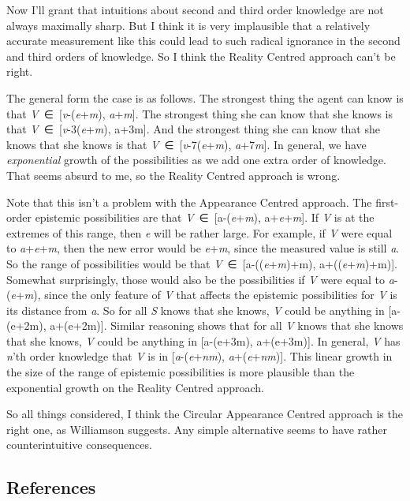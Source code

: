 \documentclass[
  10pt,
  letterpaper,
  DIV=11,
  numbers=noendperiod,
  twoside]{scrartcl}
\begin{document}
Now I'll grant that intuitions about second and third order knowledge
are not always maximally sharp. But I think it is very implausible that
a relatively accurate measurement like this could lead to such radical
ignorance in the second and third orders of knowledge. So I think the
Reality Centred approach can't be right.

The general form the case is as follows. The strongest thing the agent
can know is that \emph{V}~∈~{[}\emph{v}-(\emph{e}+\emph{m}),
\emph{a}+\emph{m}{]}. The strongest thing she can know that she knows is
that \emph{V}~∈~{[}\emph{v}-3(\emph{e}+\emph{m}), a+3m{]}. And the
strongest thing she can know that she knows that she knows is that
\emph{V}~∈~{[}\emph{v}-7(\emph{e}+\emph{m}), \emph{a}+7\emph{m}{]}. In
general, we have \emph{exponential} growth of the possibilities as we
add one extra order of knowledge. That seems absurd to me, so the
Reality Centred approach is wrong.

Note that this isn't a problem with the Appearance Centred approach. The
first-order epistemic possibilities are that
\emph{V}~∈~{[}a-(\emph{e}+\emph{m}), a+\emph{e}+\emph{m}{]}. If \emph{V}
is at the extremes of this range, then \emph{e} will be rather large.
For example, if \emph{V} were equal to \emph{a}+\emph{e}+\emph{m}, then
the new error would be \emph{e}+\emph{m}, since the measured value is
still \emph{a}. So the range of possibilities would be that
\emph{V}~∈~{[}a-((\emph{e}+\emph{m})+m), a+((\emph{e}+\emph{m})+m){]}.
Somewhat surprisingly, those would also be the possibilities if \emph{V}
were equal to \emph{a}-(\emph{e}+\emph{m}), since the only feature of
\emph{V} that affects the epistemic possibilities for \emph{V} is its
distance from \emph{a}. So for all \emph{S} knows that she knows,
\emph{V} could be anything in {[}a-(e+2m), a+(e+2m){]}. Similar
reasoning shows that for all \emph{V} knows that she knows that she
knows, \emph{V} could be anything in {[}a-(e+3m), a+(e+3m){]}. In
general, \emph{V} has \emph{n}'th order knowledge that \emph{V} is in
{[}\emph{a}-(\emph{e}+\emph{nm}), \emph{a}+(\emph{e}+\emph{nm}){]}. This
linear growth in the size of the range of epistemic possibilities is
more plausible than the exponential growth on the Reality Centred
approach.

So all things considered, I think the Circular Appearance Centred
approach is the right one, as Williamson suggests. Any simple
alternative seems to have rather counterintuitive consequences.

\subsection*{References}\label{references}
\end{document}
